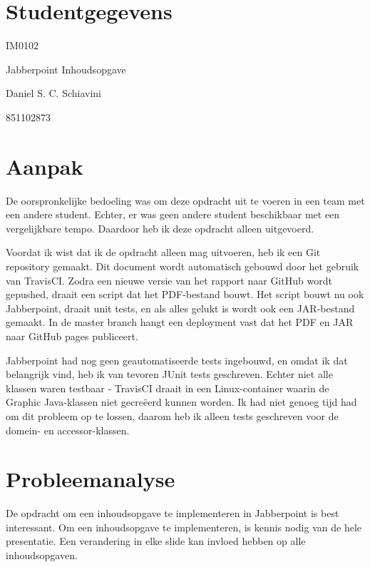 \documentclass[a4paper]{article}
\begin{document}
\pagestyle{fancy}

\section*{Studentgegevens}
\begin{description}
	\item [Cursuscode] IM0102
	\item Jabberpoint Inhoudsopgave
	\item [Naam] Daniel S. C. Schiavini
	\item [Studentnummer] 851102873
\end{description}

\section*{Aanpak}
De oorspronkelijke bedoeling was om deze opdracht uit te voeren in een team met een andere student.
Echter, er was geen andere student beschikbaar met een vergelijkbare tempo.
Daardoor heb ik deze opdracht alleen uitgevoerd.

Voordat ik wist dat ik de opdracht alleen mag uitvoeren, heb ik een Git repository gemaakt.
Dit document wordt automatisch gebouwd door het gebruik van TravisCI.
Zodra een nieuwe versie van het rapport naar GitHub wordt gepushed, draait een script dat het PDF-bestand bouwt.
Het script bouwt nu ook Jabberpoint, draait unit tests, en als alles gelukt is wordt ook een JAR-bestand gemaakt.
In de master branch hangt een deployment vast dat het PDF en JAR naar GitHub pages publiceert.

Jabberpoint had nog geen geautomatiseerde tests ingebouwd, en omdat ik dat belangrijk vind, heb ik van tevoren JUnit tests geschreven.
Echter niet alle klassen waren testbaar - TravisCI draait in een Linux-container waarin de Graphic Java-klassen niet gecreëerd kunnen worden.
Ik had niet genoeg tijd had om dit probleem op te lossen, daarom heb ik alleen tests geschreven voor de domein- en accessor-klassen.

\section{Probleemanalyse}
De opdracht om een inhoudsopgave te implementeren in Jabberpoint is best interessant.
Om een inhoudsopgave te implementeren, is kennis nodig van de hele presentatie.
Een verandering in elke slide kan invloed hebben op alle inhoudsopgaven.
\end{document}
